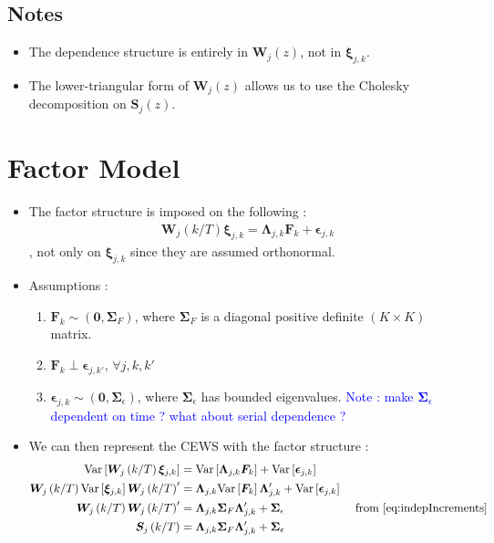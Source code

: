 \documentclass{article}
\numberwithin{equation}{section}
\newcommand{\W}[2]{\bm{W}_{#1}\left(#2/T\right)}
\newcommand{\CEWS}[2]{\bm{S}_{#1}\left(#2/T\right)}
\newcommand{\increment}[2]{\bm{\xi}_{#1,#2}}
\newcommand{\Var}[1]{\mathrm{Var}\left[#1\right]}
\newcommand{\loadings}[2]{\bm{\Lambda}_{#1,#2}}
\newcommand{\factors}[1]{\bm{F}_{#1}}
\newcommand{\idioError}[2]{\bm{\epsilon}_{#1,#2}}
\begin{document}
\subsection{Notes}
	\begin{itemize}
		\item The dependence structure is entirely in $\bm{W}_{j}(z)$, not in $\increment{j}{k}$.
		\item The lower-triangular form of $\bm{W}_{j}(z)$ allows us to use the Cholesky decomposition on $\bm{S}_{j}(z)$.
	\end{itemize}

\section{Factor Model}
	\begin{itemize}
		\item The factor structure is imposed on the following : 
			\begin{align} \label{eq:factorStructure}
				\W{j}{k} \increment{j}{k} = \loadings{j}{k} \factors{k} + \idioError{j}{k}
			\end{align}
			, not only on $\increment{j}{k}$ since they are assumed orthonormal.
		\item Assumptions : 	
			\begin{enumerate}
				\item $\factors{k} \sim (\bm{0}, \bm{\Sigma}_F)$, where $\bm{\Sigma}_F$ is a diagonal positive definite $(K \times K)$ matrix. 
				\item $\factors{k} \perp \idioError{j}{k'}$, $\forall j,k,k'$
				\item $\idioError{j}{k} \sim (\bm{0}, \bm{\Sigma}_{\epsilon})$, where $\bm{\Sigma}_{\epsilon}$ has bounded eigenvalues. \textcolor{blue}{Note : make $\bm{\Sigma}_{\epsilon}$ dependent on time ? what about serial dependence ?}
			\end{enumerate}
		\item We can then represent the CEWS with the factor structure : 
		\begin{align*}
			\Var{\W{j}{k}\increment{j}{k}}        	    &= \Var{\loadings{j}{k}\factors{k}} + \Var{\idioError{j}{k}} \\
			\W{j}{k} \Var{\increment{j}{k}} \W{j}{k}' &= \loadings{j}{k}\Var{\factors{k}}\loadings{j}{k}' +  \Var{\idioError{j}{k}}\\
			\W{j}{k}\W{j}{k}' &=  \loadings{j}{k}\bm{\Sigma}_{F}\loadings{j}{k}' +  \bm{\Sigma}_{\epsilon} &\text{ from } \eqref{eq:indepIncrements}\\
			\CEWS{j}{k} &= \loadings{j}{k}\bm{\Sigma}_{F}\loadings{j}{k}' +  \bm{\Sigma}_{\epsilon}
		\end{align*}
	\end{itemize}
\end{document}
